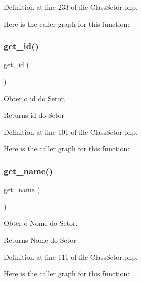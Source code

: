 Definition at line 233 of file Class\+Setor.\+php.

Here is the caller graph for this function\+:
\mbox{\label{class_class_setor_a8a94003b9d888b085c68d6eac44be175}} 
\subsubsection{\texorpdfstring{get\+\_\+id()}{get\_id()}}
{\footnotesize\ttfamily get\+\_\+id (\begin{DoxyParamCaption}{ }\end{DoxyParamCaption})}



Obter o id do Setor. 

\begin{DoxyReturn}{Returns}
id do Setor 
\end{DoxyReturn}


Definition at line 101 of file Class\+Setor.\+php.

Here is the caller graph for this function\+:
\mbox{\label{class_class_setor_a4f1149ccbd69d1ac4225b7bc2dd871bb}} 
\subsubsection{\texorpdfstring{get\+\_\+name()}{get\_name()}}
{\footnotesize\ttfamily get\+\_\+name (\begin{DoxyParamCaption}{ }\end{DoxyParamCaption})}



Obter o Nome do Setor. 

\begin{DoxyReturn}{Returns}
Nome do Setor 
\end{DoxyReturn}


Definition at line 111 of file Class\+Setor.\+php.

Here is the caller graph for this function\+:
\mbox{\label{class_class_setor_ab31da576d6d4983080ed6ed0cc9d2ed2}} 
